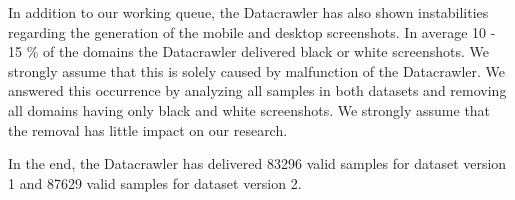 In addition to our working queue, the Datacrawler has also shown instabilities regarding the generation of the mobile and desktop screenshots. In average 10 - 15 \% of the domains the Datacrawler delivered black or white screenshots. We strongly assume that this is solely caused by malfunction of the Datacrawler. We answered this occurrence by analyzing all samples in both datasets and removing all domains having only black and white screenshots. We strongly assume that the removal has little impact on our research.

In the end, the Datacrawler has delivered 83296 valid samples for dataset version 1 and 87629 valid samples for dataset version 2.